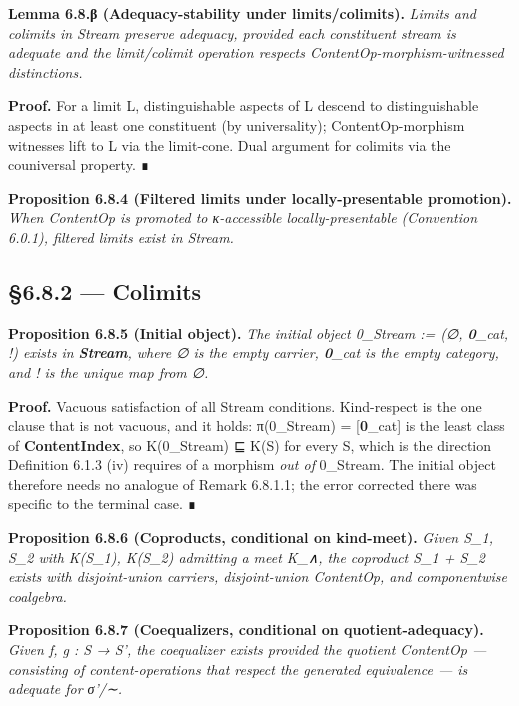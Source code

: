 \documentclass[11pt, openany]{book}
\begin{document}
\textbf{Lemma 6.8.β (Adequacy-stability under limits/colimits).} \textit{Limits and colimits in Stream preserve adequacy, provided each constituent stream is adequate and the limit/colimit operation respects ContentOp-morphism-witnessed distinctions.}

\textbf{Proof.} For a limit L, distinguishable aspects of L descend to distinguishable aspects in at least one constituent (by universality); ContentOp-morphism witnesses lift to L via the limit-cone. Dual argument for colimits via the couniversal property. ∎

\textbf{Proposition 6.8.4 (Filtered limits under locally-presentable promotion).} \textit{When ContentOp is promoted to κ-accessible locally-presentable (Convention 6.0.1), filtered limits exist in Stream.}

\subsection{§6.8.2 --- Colimits}

\textbf{Proposition 6.8.5 (Initial object).} \textit{The initial object 0\_\allowbreak{}Stream := (∅, \textbf{0}\_\allowbreak{}cat, !) exists in \textbf{Stream}, where ∅ is the empty carrier, \textbf{0}\_\allowbreak{}cat is the empty category, and ! is the unique map from ∅.}

\textbf{Proof.} Vacuous satisfaction of all Stream conditions. Kind-respect is the one clause that is not vacuous, and it holds: π(0\_\allowbreak{}Stream) = [\textbf{0}\_\allowbreak{}cat] is the least class of \textbf{ContentIndex}, so K(0\_\allowbreak{}Stream) ⊑ K(S) for every S, which is the direction Definition 6.1.3 (iv) requires of a morphism \textit{out of} 0\_\allowbreak{}Stream. The initial object therefore needs no analogue of Remark 6.8.1.1; the error corrected there was specific to the terminal case. ∎

\textbf{Proposition 6.8.6 (Coproducts, conditional on kind-meet).} \textit{Given S\_\allowbreak{}1, S\_\allowbreak{}2 with K(S\_\allowbreak{}1), K(S\_\allowbreak{}2) admitting a meet K\_\allowbreak{}∧, the coproduct S\_\allowbreak{}1 + S\_\allowbreak{}2 exists with disjoint-union carriers, disjoint-union ContentOp, and componentwise coalgebra.}

\textbf{Proposition 6.8.7 (Coequalizers, conditional on quotient-adequacy).} \textit{Given f, g : S → S', the coequalizer exists provided the quotient ContentOp --- consisting of content-operations that respect the generated equivalence --- is adequate for σ'/∼.}
\end{document}
